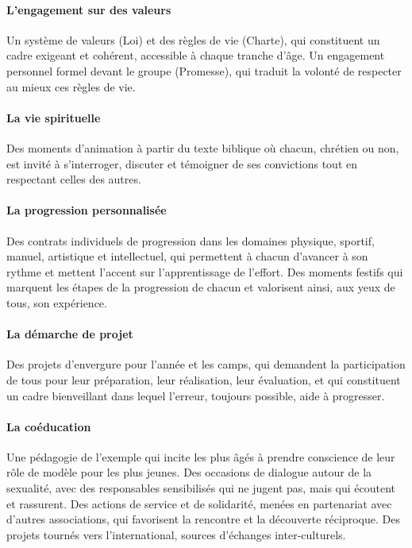 \documentclass[titlepage,11pt,a4paper]{article}
\begin{document}
\paragraph*{L'engagement sur des valeurs}

Un système de valeurs (Loi) et des règles de vie (Charte), qui constituent un cadre exigeant et cohérent, accessible à chaque tranche d'âge.
Un engagement personnel formel devant le groupe (Promesse), qui traduit la volonté de respecter au mieux ces règles de vie.

\paragraph*{La vie spirituelle}

Des moments d'animation à partir du texte biblique où chacun, chrétien ou non, est invité à s'interroger, discuter et témoigner de ses convictions tout en respectant celles des autres.

\paragraph*{La progression personnalisée}

Des contrats individuels de progression dans les domaines physique, sportif, manuel, artistique et intellectuel, qui permettent à chacun d'avancer à son rythme et mettent l'accent sur l'apprentissage de l'effort.
Des moments festifs qui marquent les étapes de la progression de chacun et valorisent ainsi, aux yeux de tous, son expérience.

\paragraph*{La démarche de projet}

Des projets d'envergure pour l'année et les camps, qui demandent la participation de tous pour leur préparation, leur réalisation, leur évaluation, et qui constituent un cadre bienveillant dans lequel l'erreur, toujours possible, aide à progresser.

\paragraph*{La coéducation}

Une pédagogie de l'exemple qui incite les plus âgés à prendre conscience de leur rôle de modèle pour les plus jeunes.
Des occasions de dialogue autour de la sexualité, avec des responsables sensibilisés qui ne jugent pas, mais qui écoutent et rassurent.
Des actions de service et de solidarité, menées en partenariat avec d'autres associations, qui favorisent la rencontre et la découverte réciproque.
Des projets tournés vers l'international, sources d'échanges inter-culturels.
\end{document}
